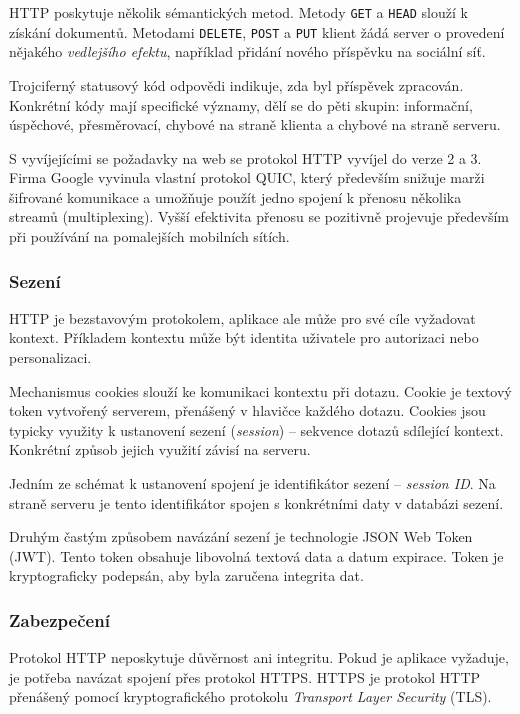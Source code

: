 HTTP poskytuje několik sémantických metod.
Metody \texttt{GET} a \texttt{HEAD} slouží k získání dokumentů.
Metodami \texttt{DELETE}, \texttt{POST} a \texttt{PUT} klient žádá server o provedení nějakého \emph{vedlejšího efektu}, například přidání nového příspěvku na sociální síť.

Trojciferný statusový kód odpovědi indikuje, zda byl příspěvek zpracován.
Konkrétní kódy mají specifické významy, dělí se do pěti skupin: informační, úspěchové, přesměrovací, chybové na straně klienta a chybové na straně serveru.

S vyvíjejícími se požadavky na web se protokol HTTP vyvíjel do verze 2 a 3.
Firma Google vyvinula vlastní protokol QUIC, který především snižuje marži šifrované komunikace a umožňuje použít jedno spojení k přenosu několika streamů (multiplexing).
Vyšší efektivita přenosu se pozitivně projevuje především při používání na pomalejších mobilních sítích.


\subsubsection{Sezení}

HTTP je bezstavovým protokolem, aplikace ale může pro své cíle vyžadovat kontext.
Příkladem kontextu může být identita uživatele pro autorizaci nebo personalizaci.

Mechanismus cookies slouží ke komunikaci kontextu při dotazu.
Cookie je textový token vytvořený serverem, přenášený v hlavičce každého dotazu.
Cookies jsou typicky využity k ustanovení sezení (\emph{session}) -- sekvence dotazů sdílející kontext. 
Konkrétní způsob jejich využití závisí na serveru.
\cite{cookies}

Jedním ze schémat k ustanovení spojení je identifikátor sezení -- \emph{session ID}.
Na straně serveru je tento identifikátor spojen s konkrétními daty v databázi sezení.

Druhým častým způsobem navázání sezení je technologie JSON Web Token (JWT).
Tento token obsahuje libovolná textová data a datum expirace.
Token je kryptograficky podepsán, aby byla zaručena integrita dat.

\subsubsection{Zabezpečení}

Protokol HTTP neposkytuje důvěrnost ani integritu.
Pokud je aplikace vyžaduje, je potřeba navázat spojení přes protokol HTTPS.
HTTPS je protokol HTTP přenášený pomocí kryptografického protokolu \emph{Transport Layer Security} (TLS).

